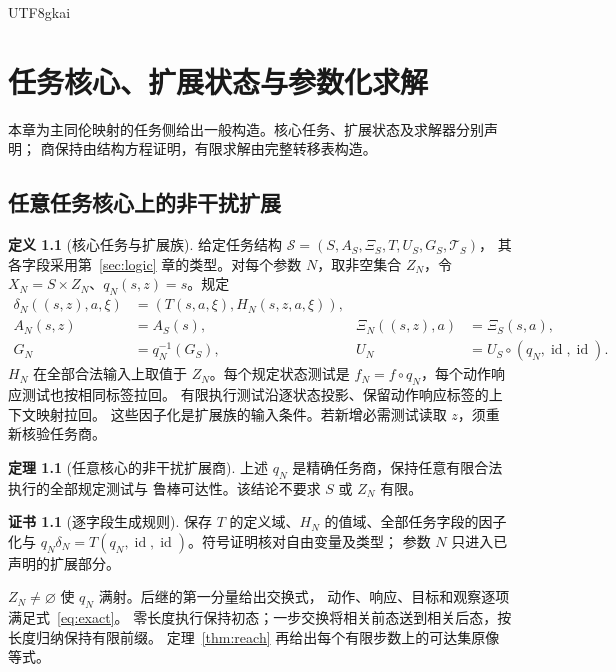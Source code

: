 \documentclass[12pt]{report}
\makeatletter
\theoremstyle{definition}
\newtheorem{definition}{定义}[chapter]
\newtheorem{theorem}{定理}[chapter]
\newtheorem{Certificate}{证书}[chapter]
\renewenvironment{proof}[1][\proofname]{\par
  \pushQED{\qed}\normalfont
  \topsep6\p@\@plus6\p@\relax
  \trivlist
  \item[\hskip\labelsep\normalfont #1\@addpunct{.}]\ignorespaces
}{
  \popQED\endtrivlist\@endpefalse
}
\newcommand{\id}{\operatorname{id}}
\makeatother
\begin{document}
\begin{CJK*}{UTF8}{gkai}
\chapter{任务核心、扩展状态与参数化求解}
\label{sec:task-core}
本章为主同伦映射的任务侧给出一般构造。核心任务、扩展状态及求解器分别声明；
商保持由结构方程证明，有限求解由完整转移表构造。
\section{任意任务核心上的非干扰扩展}
\begin{definition}[核心任务与扩展族]
\label{def:core-fields}
给定任务结构 \(\mathcal S=(S,A_S,\Xi_S,T,U_S,G_S,\mathcal T_S)\)，
其各字段采用第~\ref{sec:logic} 章的类型。对每个参数 \(N\)，取非空集合
\(Z_N\)，令 \(X_N=S\times Z_N\)、\(q_N(s,z)=s\)。规定
\begin{equation}\label{eq:gen}
\begin{aligned}
\delta_N((s,z),a,\xi)&=(T(s,a,\xi),H_N(s,z,a,\xi)),\\
A_N(s,z)&=A_S(s),&\Xi_N((s,z),a)&=\Xi_S(s,a),\\
G_N&=q_N^{-1}(G_S),&U_N&=U_S\circ(q_N,\id,\id).
\end{aligned}
\end{equation}
\(H_N\) 在全部合法输入上取值于 \(Z_N\)。每个规定状态测试是
\(f_N=f\circ q_N\)，每个动作响应测试也按相同标签拉回。
有限执行测试沿逐状态投影、保留动作响应标签的上下文映射拉回。
这些因子化是扩展族的输入条件。若新增必需测试读取 \(z\)，须重新核验任务商。
\end{definition}
\begin{theorem}[任意核心的非干扰扩展商]
\label{thm:noninterference}
上述 \(q_N\) 是精确任务商，保持任意有限合法执行的全部规定测试与
鲁棒可达性。该结论不要求 \(S\) 或 \(Z_N\) 有限。
\end{theorem}
\begin{Certificate}[逐字段生成规则]
保存 \(T\) 的定义域、\(H_N\) 的值域、全部任务字段的因子化与
\(q_N\delta_N=T(q_N,\id,\id)\)。符号证明核对自由变量及类型；
参数 \(N\) 只进入已声明的扩展部分。
\end{Certificate}
\begin{proof}
\(Z_N\ne\varnothing\) 使 \(q_N\) 满射。后继的第一分量给出交换式，
动作、响应、目标和观察逐项满足式~\eqref{eq:exact}。
零长度执行保持初态；一步交换将相关前态送到相关后态，按长度归纳保持有限前缀。
定理~\ref{thm:reach} 再给出每个有限步数上的可达集原像等式。
\end{proof}


\end{CJK*}
\end{document}
